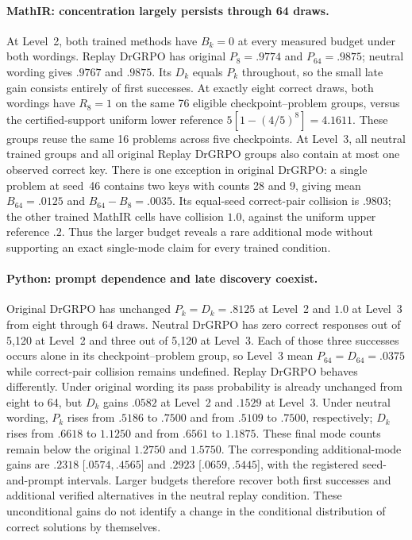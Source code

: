 \documentclass{article}
\newcommand{\1}{\mathbf 1}
\theoremstyle{remark}
\theoremstyle{definition}
\theoremstyle{plain}
\begin{document}
\paragraph{MathIR: concentration largely persists through 64 draws.}
At Level~2, both trained methods have $B_k=0$ at every measured budget under
both wordings. Replay DrGRPO has original $P_8=.9774$ and $P_{64}=.9875$;
neutral wording gives $.9767$ and $.9875$. Its $D_k$ equals $P_k$ throughout,
so the small late gain consists entirely of first successes. At exactly eight
correct draws, both wordings have $R_8=1$ on the same 76 eligible
checkpoint--problem groups, versus the certified-support uniform lower
reference $5[1-(4/5)^8]=4.1611$. These groups reuse the same 16 problems
across five checkpoints. At Level~3, all neutral trained groups and all
original Replay DrGRPO groups also contain at most one observed correct key.
There is one exception in original DrGRPO: a single problem at seed~46
contains two keys with counts 28 and 9, giving mean $B_{64}=.0125$ and
$B_{64}-B_8=.0035$. Its equal-seed correct-pair collision is $.9803$;
the other trained MathIR cells have collision $1.0$, against the uniform
upper reference $.2$. Thus the larger budget reveals a rare additional mode
without supporting an exact single-mode claim for every trained condition.

\paragraph{Python: prompt dependence and late discovery coexist.}
Original DrGRPO has unchanged $P_k=D_k=.8125$ at Level~2 and $1.0$ at
Level~3 from eight through 64 draws. Neutral DrGRPO has zero correct responses
out of 5,120 at Level~2 and three out of 5,120 at Level~3. Each of those
three successes occurs alone in its checkpoint--problem group, so Level~3
mean $P_{64}=D_{64}=.0375$ while correct-pair collision remains undefined.
Replay DrGRPO behaves differently. Under original wording its pass probability
is already unchanged from eight to 64, but $D_k$ gains $.0582$ at Level~2
and $.1529$ at Level~3. Under neutral wording, $P_k$ rises from $.5186$ to
$.7500$ and from $.5109$ to $.7500$, respectively; $D_k$ rises from $.6618$
to $1.1250$ and from $.6561$ to $1.1875$. These final mode counts remain
below the original $1.2750$ and $1.5750$. The corresponding additional-mode
gains are $.2318$ [$.0574,.4565$] and $.2923$ [$.0659,.5445$], with the
registered seed-and-prompt intervals. Larger budgets therefore recover both
first successes and additional verified alternatives in the neutral replay
condition. These unconditional gains do not identify a change in the
conditional distribution of correct solutions by themselves.
\end{document}
